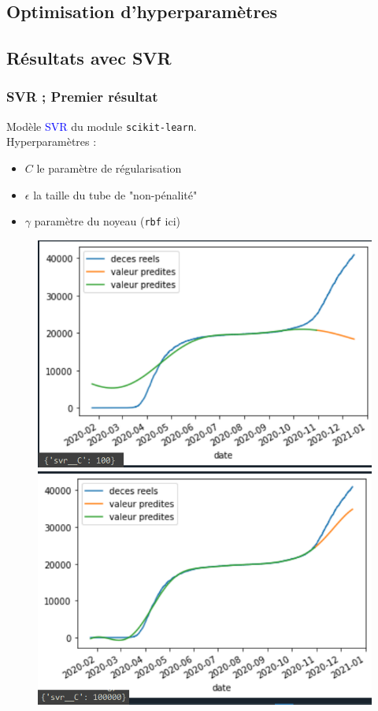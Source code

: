 \documentclass{beamer}[aspectratio = 43]
\begin{document}
\subsection{Optimisation d'hyperparamètres}
\subsection{Résultats avec SVR}
\begin{frame}
	\frametitle{SVR ; Premier résultat}
	Modèle \textcolor{blue}{SVR} du module \texttt{scikit-learn}.\\
	Hyperparamètres :
	\begin{itemize}
		\item[]$C$ le paramètre de régularisation
		\item[]$\epsilon$ la taille du tube de "non-pénalité"
		\item[]$\gamma$ paramètre du noyeau (\texttt{rbf} ici)
	\end{itemize}
	\begin{figure}[h]
		\centering
		\begin{minipage}{0.5\textwidth}
			\includegraphics[scale=0.37]{svr100}
		\end{minipage}%
		\begin{minipage}{0.5\textwidth}
			\includegraphics[scale=0.37]{svr100000}

\end{minipage}
\end{figure}
\end{frame}
\end{document}
